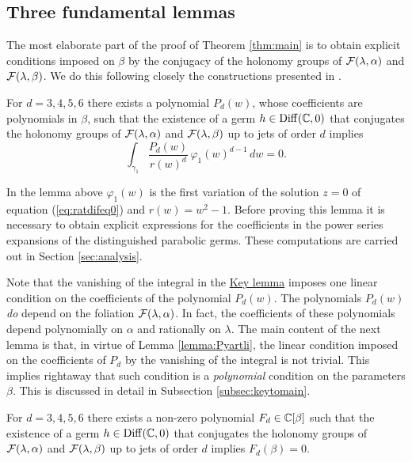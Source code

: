 \subsection{Three fundamental lemmas}\label{subsec:mainlemmas}

The most elaborate part of the proof of Theorem \ref{thm:main} is to obtain explicit conditions imposed on $\beta$ by the conjugacy of the holonomy groups of $\mathcal{F}(\lambda,\alpha)$ and $\mathcal{F}(\lambda,\beta)$. We do this following closely the constructions presented in \cite{Pyartli2006}.

\begin{key}\label{lemma:key}
For $d=3,4,5,6$ there exists a polynomial $P_d(w)$, whose coefficients are polynomials in $\beta$, such that the existence of a germ $h\in\operatorname{Diff}(\mathbb{C},0)$ that conjugates the holonomy groups of $\mathcal{F}(\lambda,\alpha)$ and $\mathcal{F}(\lambda,\beta)$ up to jets of order $d$ implies
\begin{equation}\label{eq:keylemma}
 \int_{\gamma_1}\frac{P_d(w)}{r(w)^{d}}\,\varphi_1(w)^{d-1}\,dw=0. 
\end{equation}
\end{key} 
In the lemma above $\varphi_1(w)$ is the first variation of the solution $z=0$ of equation (\ref{eq:ratdifeq0}) and $r(w)=w^2-1$. Before proving this lemma it is necessary to obtain explicit expressions for the coefficients in the power series expansions of the distinguished parabolic germs. These computations are carried out in Section \ref{sec:analysis}.

\begin{remark}\label{rmk:dependence}
Note that the vanishing of the integral in the \hyperref[lemma:key]{Key lemma} imposes one linear condition on the coefficients of the polynomial $P_d(w)$. The polynomials $P_d(w)$ \emph{do} depend on the foliation $\mathcal{F}(\lambda,\alpha)$. In fact, the coefficients of these polynomials depend polynomially on $\alpha$ and rationally on $\lambda$. The main content of the next lemma is that, in virtue of Lemma \ref{lemma:Pyartli}, the linear condition imposed on the coefficients of $P_d$ by the vanishing of the integral is not trivial. This implies rightaway that such condition is a \emph{polynomial} condition on the parameters $\beta$. This is discussed in detail in Subsection \ref{subsec:keytomain}.
\end{remark}

\begin{main}\label{lemma:main}
For $d=3,4,5,6$ there exists a non-zero polynomial $F_d\in\mathbb{C}[\beta]$ such that the existence of a germ $h\in\operatorname{Diff}(\mathbb{C},0)$ that conjugates the holonomy groups of $\mathcal{F}(\lambda,\alpha)$ and $\mathcal{F}(\lambda,\beta)$ up to jets of order $d$ implies $F_d(\beta)=0$.
\end{main}

